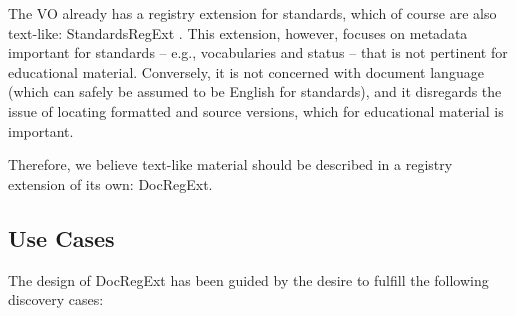 \documentclass{ivoa}
\begin{document}
The VO already has a registry extension for standards, which of
course are also text-like: StandardsRegExt \citep{2012ivoa.spec.0508H}.  This extension,
however, focuses on metadata important for standards – e.g.,
vocabularies and status – that is not pertinent for educational
material.  Conversely, it is not concerned with document language (which
can safely be assumed to be English for standards), and it disregards
the issue of locating formatted and source versions, which for educational
material is important.  

Therefore, we believe text-like material should be described in a 
registry extension of its own: DocRegExt.


\subsection{Use Cases}

\label{sect:regext-usecases}

The design of DocRegExt has been guided by the desire to fulfill the
following discovery cases:
\end{document}
